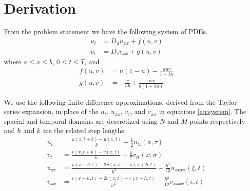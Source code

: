 \section{Derivation}

From the problem statement we have the following system of PDEs.
\begin{subequations} \label{eq:system}
\begin{align}
    u_t &= D_u u_{xx} + f(u,v) \label{eq:prey} \\
    v_t &= D_v v_{xx} + g(u,v) \label{eq:pred}
\end{align}
\end{subequations}
where $a \leq x \leq b$, $0 \leq t \leq T$, and
\begin{subequations}
\begin{align}
    f(u,v) &= u(1-u) - \frac{auv}{1+\lambda u} \\
    g(u,v) &= - \frac{v}{ab} + \frac{auv}{b(1+\lambda u)}
\end{align}
\end{subequations}

We use the following finite difference approximations, derived from the Taylor
series expansion, in place of the $u_t$, $u_{xx}$, $v_t$, and $v_{xx}$ in
equations \eqref{eq:system}. The spacial and temporal domains are descretized
using $N$ and $M$ points respectively and $h$ and $k$ are the related step
lengths.
\begin{subequations} \label{eq:taylor}
\begin{align}
    u_t &= \frac{u(x,t+k)-u(x,t)}{k} - \frac{k}{2} u_{tt}(x,\tau) \label{eq:u_t}
    \\
    v_t &= \frac{v(x,t+k)-v(x,t)}{k} - \frac{k}{2} v_{tt}(x,\sigma) \label{eq:v_t}
    \\
    u_{xx} &= \frac{u(x-h,t)-2u(x,t)+u(x+h,t)}{h^2} -
        \frac{h^2}{12} u_{xxxx}(\xi,t) \label{eq:u_xx}
    \\
    v_{xx} &= \frac{v(x-h,t)-2v(x,t)+v(x+h,t)}{h^2} -
        \frac{h^2}{12} v_{xxxx}(\epsilon,t) \label{eq:v_xx}
\end{align}
\end{subequations}

